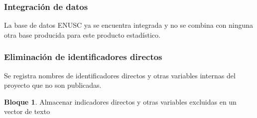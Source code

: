 \documentclass[
]{book}
\theoremstyle{definition}
\theoremstyle{definition}
\newtheorem{example}{Bloque}[chapter]
\theoremstyle{definition}
\theoremstyle{definition}
\theoremstyle{remark}
\begin{document}
\hypertarget{integraciuxf3n-de-datos}{%
\subsubsection{Integración de datos}\label{integraciuxf3n-de-datos}}

La base de datos ENUSC ya se encuentra integrada y no se combina con ninguna otra base producida para este producto estadístico.

\hypertarget{eliminaciuxf3n-de-identificadores-directos}{%
\subsubsection{Eliminación de identificadores directos}\label{eliminaciuxf3n-de-identificadores-directos}}

Se registra nombres de identificadores directos y otras variables internas del proyecto que no son publicadas.

\begin{example}
\protect\hypertarget{exm:bloque26nbm}{}\label{exm:bloque26nbm}Almacenar indicadores directos y otras variables excluidas en un vector de texto
\end{example}
\end{document}
